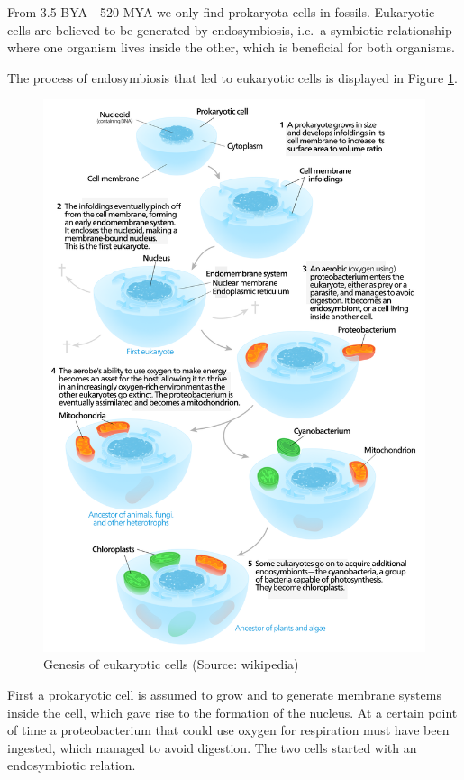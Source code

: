 \documentclass[
  11pt,
]{book}
\begin{document}
From 3.5 BYA - 520 MYA we only find prokaryota cells in fossils.
Eukaryotic cells are believed to be generated by endosymbiosis, i.e.~a symbiotic relationship where one organism lives inside the other, which is beneficial for both organisms.

The process of endosymbiosis that led to eukaryotic cells is displayed in Figure \ref{fig:endosymbiosis}.

\begin{figure}

{\centering \includegraphics[width=0.8\linewidth]{./figs/endosymbiosis} 

}

\caption{Genesis of eukaryotic cells (Source: wikipedia)}\label{fig:endosymbiosis}
\end{figure}

First a prokaryotic cell is assumed to grow and to generate membrane systems inside the cell, which gave rise to the formation of the nucleus. At a certain point of time a proteobacterium that could use oxygen for respiration must have been ingested, which managed to avoid digestion. The two cells started with an endosymbiotic relation.
\end{document}

